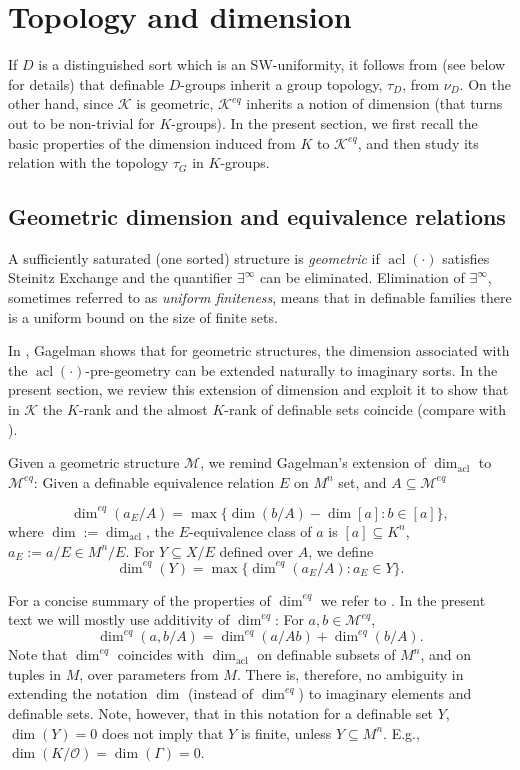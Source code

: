 \documentclass[11pt]{amsart}
\DeclareMathOperator{\acl}{acl}
\theoremstyle{definition}
\newcommand{\CK}{{\mathcal K}}
\newcommand{\CM}{{\mathcal M}}
\newcommand{\CO}{{\mathcal O}}
\newcommand{\0}{\emptyset}
\def\sub{\subseteq}
\begin{document}
 
\section{Topology and dimension}
If $D$ is a distinguished sort which is an SW-uniformity, it follows from \cite{HaHaPeGps} (see below for details) that definable $D$-groups inherit a group topology, $\tau_D$, from $\nu_D$. On the other hand, since $\CK$ is geometric, $\CK^{eq}$ inherits a notion of dimension (that turns out to be non-trivial for $K$-groups). In the present section, we first recall the basic properties of the dimension induced from $K$ to $\CK^{eq}$, and then study its relation with the topology $\tau_G$ in $K$-groups. 

\subsection{Geometric dimension and equivalence relations}
A sufficiently saturated (one sorted) structure is \emph{geometric} if $\acl(\cdot)$ satisfies Steinitz Exchange and the quantifier  $\exists^\infty$ can be eliminated. Elimination of $\exists^\infty$, sometimes referred to as \emph{uniform finiteness}, means that in definable families there is a uniform bound on the size of finite sets. 

In \cite{Gagelman}, Gagelman shows that for geometric structures, the dimension associated with the $\acl(\cdot)$-pre-geometry can be extended naturally to imaginary sorts. In the present section, we review this extension of dimension and exploit it to show that in $\CK$ the  $K$-rank and the almost $K$-rank of definable sets coincide (compare with \cite[Corollary 4.37]{JohnTopQp}).

Given a geometric structure $\CM$, we remind Gagelman's extension of $\dim_{\acl}$ to $\CM^{eq}$:  Given a definable equivalence relation $E$ on $M^n$ set, and $A\sub \CM^{eq}$ 

\[\dim^{eq}(a_E/A)=\max\{\dim(b/A)-\dim[a]:b\in [a]\},\] where $\dim:=\dim_{\acl}$,
the $E$-equivalence class of $a$ is $[a]\sub K^n$, $a_E:=a/E\in M^n/E$. 
For $Y\sub X/E$ defined over $A$, we define
\[\dim^{eq}(Y)=\max\{\dim^{eq}(a_E/A):a_E\in Y\}.\]

For a concise summary of the properties of $\dim^{eq}$ we refer to \cite[\S 2]{JohnTopQp}. In the present text we will mostly use additivity of $\dim^{eq}$: For $a,b\in \CM^{eq}$, 
\[
\dim^{eq}(a,b/A)=\dim^{eq}(a/Ab)+\dim^{eq} (b/A).
\]
Note that $\dim^{eq}$ coincides with $\dim_{\acl}$ on definable subsets of $M^n$, and on tuples in $M$, over parameters from $M$.  There is, therefore, no ambiguity in extending the notation $\dim$ (instead of $\dim^{eq}$) to imaginary elements and definable sets. Note, however, that in this notation for a definable set $Y$, $\dim(Y)=0$ does not imply that $Y$ is finite, unless $Y\sub M^n$. E.g., $\dim(K/\CO)=\dim(\Gamma)=0$.
\end{document}
